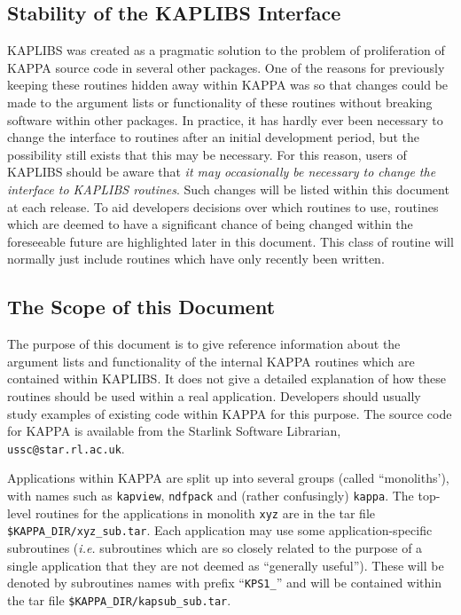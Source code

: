 \subsection{Stability of the KAPLIBS Interface}
KAPLIBS was created as a pragmatic solution to the problem of
proliferation of KAPPA source code in several other packages. One of the
reasons for previously keeping these routines hidden away within KAPPA was
so that changes could be made to the argument lists or functionality 
of these routines without breaking software within other packages. In
practice, it has hardly ever been necessary to change the interface to
routines after an initial development period, but the possibility still
exists that this may be necessary. For this reason, users of KAPLIBS
should be aware that \emph{it may occasionally be necessary to change the
interface to KAPLIBS routines}. Such changes will be listed within 
this document at each release. To aid developers decisions over which
routines to use, routines which are deemed to have a significant chance
of being changed within the foreseeable future are highlighted later in
this document. This class of routine will normally just include routines
which have only recently been written.

\subsection{The Scope of this Document}
The purpose of this document is to give reference information about the
argument lists and functionality of the internal KAPPA routines which are
contained within KAPLIBS. It does not give a detailed explanation of how
these routines should be used within a real application. Developers
should usually study examples of existing code within KAPPA for this
purpose. The source code for KAPPA is available from the Starlink
Software Librarian, {\tt ussc@star.rl.ac.uk}.

Applications within KAPPA are split up into several groups (called
``monoliths'), with names such as {\tt kapview}, {\tt ndfpack} and
(rather confusingly) {\tt kappa}. The top-level routines for the
applications in monolith {\tt xyz} are in the tar file {\tt
\$KAPPA\_DIR/xyz\_sub.tar}. Each application may use some
application-specific subroutines (\emph{i.e.} subroutines which are so
closely related to the purpose of a single application that they are not
deemed as ``generally useful''). These will be denoted by subroutines
names with prefix ``{\tt KPS1\_}'' and will be contained within the tar
file {\tt \$KAPPA\_DIR/kapsub\_sub.tar}.

